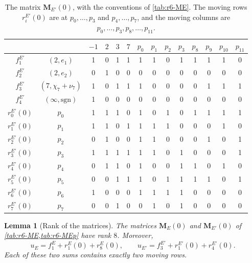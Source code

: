 \documentclass[12pt,oneside,openany]{book}
\theoremstyle{definition}
\theoremstyle{plain}
\numberwithin{equation}{chapter}
\theoremstyle{plain}
\newtheorem{lemma}[lemma]{Lemma}
\theoremstyle{definition}
\theoremstyle{remark}
\begin{document}
\begin{table}[htbp]
\centering
\setlength{\tabcolsep}{4.2pt}
\caption{The matrix $\mathbf M_{E'}(0)$, with the conventions of \cref{tab:r6-ME}. The moving rows $r^{E'}_i(0)$ are at $p_0,\dots,p_3$ and $p_4,\dots,p_7$, and the moving columns are $p_0,\dots,p_3,p_8,\dots,p_{11}$.}
\label{tab:r6-MEp}
\begin{tabular}{cc@{\hspace{10pt}}cccc@{\hspace{12pt}}cccccccc}
\toprule
 & & $-1$ & $2$ & $3$ & $7$ & $p_0$ & $p_1$ & $p_2$ & $p_3$ & $p_8$ & $p_9$ & $p_{10}$ & $p_{11}$\\
\midrule
$f^{E'}_1$ & $(2,e_1)$ & 1 & 0 & 1 & 1 & 1 & 1 & 0 & 1 & 1 & 1 & 1 & 0 \\
$f^{E'}_2$ & $(2,e_2)$ & 0 & 1 & 0 & 0 & 0 & 0 & 0 & 0 & 0 & 0 & 0 & 0 \\
$f^{E'}_3$ & $(7,\chi_7+\nu_7)$ & 1 & 0 & 1 & 1 & 1 & 0 & 0 & 0 & 0 & 1 & 1 & 1 \\
$f^{E'}_4$ & $(\infty,\mathrm{sgn})$ & 1 & 0 & 0 & 0 & 0 & 0 & 0 & 0 & 0 & 0 & 0 & 0 \\
\midrule
$r^{E'}_0(0)$ & $p_0$ & 1 & 1 & 1 & 0 & 1 & 0 & 1 & 0 & 1 & 1 & 1 & 1 \\
$r^{E'}_1(0)$ & $p_1$ & 1 & 1 & 0 & 1 & 1 & 1 & 1 & 0 & 0 & 0 & 1 & 0 \\
$r^{E'}_2(0)$ & $p_2$ & 0 & 1 & 0 & 0 & 1 & 1 & 0 & 0 & 0 & 1 & 0 & 1 \\
$r^{E'}_3(0)$ & $p_3$ & 1 & 1 & 1 & 1 & 1 & 1 & 0 & 1 & 0 & 0 & 0 & 1 \\
$r^{E'}_4(0)$ & $p_4$ & 0 & 1 & 1 & 0 & 1 & 0 & 0 & 1 & 1 & 0 & 1 & 0 \\
$r^{E'}_5(0)$ & $p_5$ & 0 & 0 & 1 & 1 & 1 & 0 & 1 & 1 & 1 & 1 & 0 & 1 \\
$r^{E'}_6(0)$ & $p_6$ & 1 & 0 & 0 & 0 & 1 & 1 & 1 & 1 & 0 & 0 & 0 & 0 \\
$r^{E'}_7(0)$ & $p_7$ & 0 & 0 & 1 & 0 & 0 & 1 & 0 & 1 & 0 & 0 & 0 & 0 \\
\bottomrule
\end{tabular}
\end{table}

\begin{lemma}[Rank of the matrices]\label{lem:r6-rank}
The matrices $\mathbf M_E(0)$ and $\mathbf M_{E'}(0)$ of \cref{tab:r6-ME,tab:r6-MEp} have rank $8$. Moreover,
\begin{equation}\label{r6:u-sums}
u_E=f^E_1+r^E_1(0)+r^E_8(0),\qquad u_{E'}=f^{E'}_3+r^{E'}_1(0)+r^{E'}_4(0).
\end{equation}
Each of these two sums contains exactly two moving rows.
\end{lemma}
\end{document}
